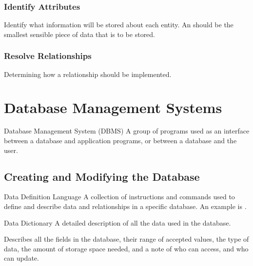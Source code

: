 \documentclass[\main/notes.tex]{subfiles}
\begin{document}
				\subsubsection{Identify Attributes}
					Identify what information will be stored about each entity. An  should be the smallest sensible piece of data that is to be stored.
				\subsubsection{Resolve Relationships}
					Determining how a relationship should be implemented.

		\pagebreak
		\section{Database Management Systems}
			\begin{definition}{Database Management System (DBMS)}
				A group of programs used as an interface between a database and application programs, or between a database and the user.
			\end{definition}
			\subsection{Creating and Modifying the Database}
				\begin{definition}{Data Definition Language}
					A collection of instructions and commands used to define and describe data and relationships in a specific database. An example is .
				\end{definition}
				\begin{definition}{Data Dictionary}
					A detailed description of all the data used in the database.

					Describes all the fields in the database, their range of accepted values, the type of data, the amount of storage space needed, and a note of who can access, and who can update.
				\end{definition}
\end{document}
